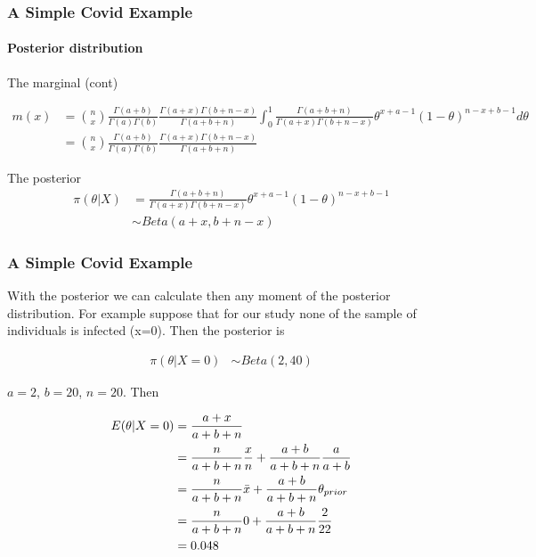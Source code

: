 \documentclass[
  shownotes,
  xcolor={svgnames},
  hyperref={colorlinks,citecolor=DarkBlue,linkcolor=DarkRed,urlcolor=DarkBlue}
  ]{beamer}
\begin{document}
\begin{frame}[fragile]
\frametitle{A Simple Covid Example}
\framesubtitle{Posterior distribution}
The marginal (cont)

\begin{scriptsize}
\begin{align}
 m(x) &= \binom{n}{x} \frac{\Gamma(a+b)}{\Gamma(a)\Gamma(b)}  \frac{\Gamma(a+x)\Gamma(b+n-x)}{\Gamma(a+b+n)} \int_0^1  \frac{\Gamma(a+b+n)}{\Gamma(a+x)\Gamma(b+n-x)} \theta^{x+a-1}(1-\theta)^{n-x+b-1}  d\theta \\
 &= \binom{n}{x} \frac{\Gamma(a+b)}{\Gamma(a)\Gamma(b)}  \frac{\Gamma(a+x)\Gamma(b+n-x)}{\Gamma(a+b+n)}
\end{align}
\end{scriptsize}

The posterior
\begin{align}
\pi(\theta|X) &=  \frac{\Gamma(a+b+n)}{\Gamma(a+x)\Gamma(b+n-x)} \theta^{x+a-1}(1-\theta)^{n-x+b-1}  \\
              &\sim Beta(a+x,b+n-x)
\end{align}

\end{frame}
\begin{frame}[fragile]
\frametitle{A Simple Covid Example}
With the posterior we can calculate then any moment of the posterior distribution. For example suppose that for our study none of the sample of individuals is infected (x=0). Then the posterior is 

\begin{align}
\pi(\theta|X=0) &\sim Beta(2,40)
\end{align}

$a= 2$, $b=20$, $n=20$. Then

\begin{align}
\tiny
E(\theta|X=0)  &= \frac{a+x}{a+b+n} \\
               &= \frac{n}{a+b+n} \frac{x}{n} + \frac{a+b}{a+b+n} \frac{a}{a+b}  \\
               &= \frac{n}{a+b+n} \bar x + \frac{a+b}{a+b+n} \theta_{prior}  \\
               &= \frac{n}{a+b+n} 0 + \frac{a+b}{a+b+n} \frac{2}{22}  \\
 &= 0.048 
\end{align}

\end{frame}
\end{document}
